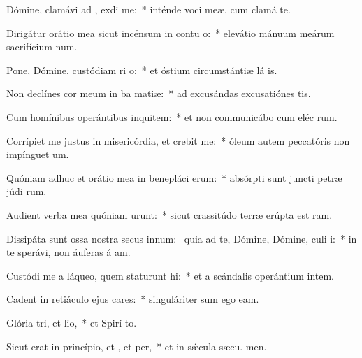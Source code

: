 \item Dómine, clamávi ad , exdi me:~* inténde voci meæ, cum clamá  te.
\item Dirigátur orátio mea sicut incénsum in contu o:~* elevátio mánuum meárum sacrifícium num.
\item Pone, Dómine, custódiam ri o:~* et óstium circumstántiæ lá is.
\item Non declínes cor meum in ba matiæ:~* ad excusándas excusatiónes  tis.
\item Cum homínibus operántibus inquitem:~* et non communicábo cum eléc rum.
\item Corrípiet me justus in misericórdia, et crebit me:~* óleum autem peccatóris non impínguet  um.
\item Quóniam adhuc et orátio mea in benepláci erum:~* absórpti sunt juncti petræ júdi rum.
\item Audient verba mea quóniam urunt:~* sicut crassitúdo terræ erúpta est  ram.
\item Dissipáta sunt ossa nostra secus innum:~\pscross{} quia ad te, Dómine, Dómine, culi i:~* in te sperávi, non áuferas á am.
\item Custódi me a láqueo, quem staturunt hi:~* et a scándalis operántium intem.
\item Cadent in retiáculo ejus cares:~* singuláriter sum ego  eam.
\item Glória tri, et lio,~* et Spirí to.
\item Sicut erat in princípio, et , et per,~* et in sǽcula sæcu. men.
